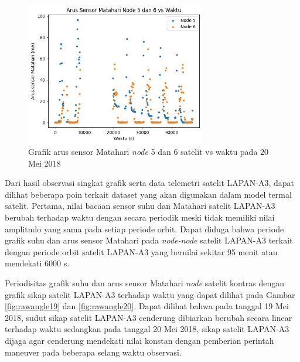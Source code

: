 \begin{figure}[H]
\setlength{}
\begin{center}
\includegraphics[width=0.7\textwidth]{fig/raw_node56_css_2018-05-20.png}
	\caption{Grafik arus sensor Matahari \textit{node} 5 dan 6 satelit vs waktu pada 20 Mei 2018}
\label{fig:rawcss5620}
\end{center}
\end{figure}

Dari hasil observasi singkat grafik serta data telemetri satelit LAPAN-A3, dapat
dilihat beberapa poin terkait dataset yang akan digunakan dalam model termal
satelit. Pertama, nilai bacaan sensor suhu dan Matahari satelit LAPAN-A3
berubah terhadap waktu dengan secara periodik meski tidak memiliki nilai
amplitudo yang sama pada setiap periode orbit. Dapat diduga bahwa periode
grafik suhu dan arus sensor Matahari pada \textit{node-node} satelit LAPAN-A3
terkait dengan periode orbit satelit LAPAN-A3 yang bernilai sekitar 95 menit
atau mendekati 6000 s.

Periodisitas grafik suhu dan arus sensor Matahari \textit{node} satelit kontras
dengan grafik sikap satelit LAPAN-A3 terhadap waktu yang dapat dilihat pada
Gambar \ref{fig:rawangle19} dan \ref{fig:rawangle20}. Dapat dilihat bahwa pada
tanggal 19 Mei 2018, sudut sikap satelit LAPAN-A3 cenderung dibiarkan berubah
secara linear terhadap waktu sedangkan pada tanggal 20 Mei 2018, sikap satelit
LAPAN-A3 dijaga agar cenderung mendekati nilai konstan dengan pemberian
perintah maneuver pada beberapa selang waktu observasi.

